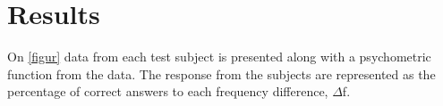 \section*{Results}
On \autoref{figur} data from each test subject is presented along with a psychometric function from the data. The response from the subjects are represented as the percentage of correct answers to each frequency difference, $\Delta$f. 